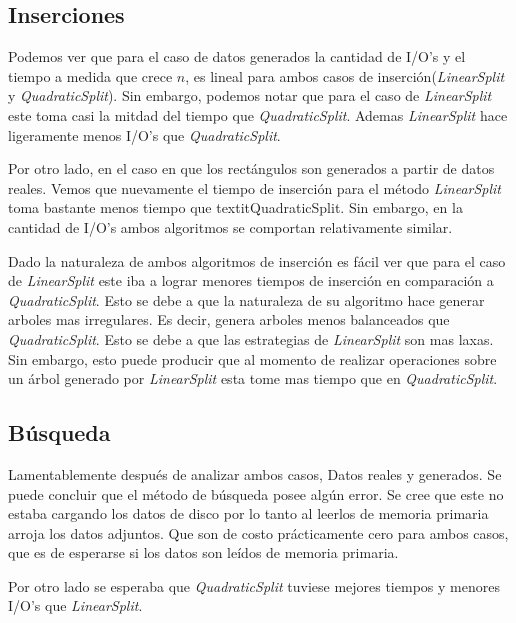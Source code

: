 \documentclass[letterpaper,12pt]{article}
\begin{document}
 \subsection{Inserciones}
 
Podemos ver que para el caso de datos generados la cantidad de I/O's y el tiempo a medida que crece $n$, es lineal para ambos casos de inserción(\textit{LinearSplit} y \textit{QuadraticSplit}). Sin embargo, podemos notar que para el caso de \textit{LinearSplit} este toma casi la mitdad del tiempo que \textit{QuadraticSplit}. Ademas \textit{LinearSplit} hace ligeramente menos I/O's que \textit{QuadraticSplit}.

Por otro lado, en el caso en que los rectángulos son generados a partir de datos reales. Vemos que nuevamente el tiempo de inserción para el método \textit{LinearSplit} toma bastante menos tiempo que textit{QuadraticSplit}. Sin embargo, en la cantidad de I/O's ambos algoritmos se comportan relativamente similar.

Dado la naturaleza de ambos algoritmos de inserción es fácil ver que para el caso de \textit{LinearSplit} este iba a lograr menores tiempos de inserción en comparación a \textit{QuadraticSplit}. Esto se debe a que la naturaleza de su algoritmo hace generar arboles mas irregulares. Es decir, genera arboles menos balanceados que \textit{QuadraticSplit}. Esto se debe a que las estrategias de \textit{LinearSplit} son mas laxas. Sin embargo, esto puede producir que al momento de realizar operaciones sobre un árbol generado por \textit{LinearSplit} esta tome mas tiempo que en \textit{QuadraticSplit}.

 
\subsection{Búsqueda}
Lamentablemente después de analizar ambos casos, Datos reales y generados. Se puede concluir que el método de búsqueda posee algún error. Se cree que este no estaba cargando los datos de disco por lo tanto al leerlos de memoria primaria arroja los datos adjuntos. Que son de costo prácticamente cero para ambos casos, que es de esperarse si los datos son leídos de memoria primaria.  

Por otro lado se esperaba que \textit{QuadraticSplit} tuviese mejores tiempos y menores I/O's que \textit{LinearSplit}.
 
\end{document}
